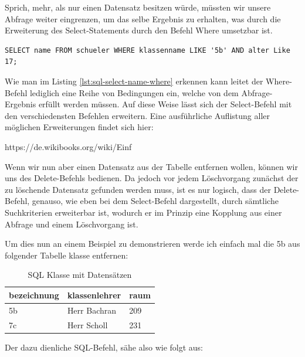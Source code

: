 \documentclass[12pt,a4paper,bibliography=totocnumbered,listof=totocnumbered]{scrartcl}
\begin{document}
Sprich, mehr, als nur einen Datensatz besitzen würde, müssten wir unsere Abfrage weiter eingrenzen, um das selbe Ergebnis zu erhalten, was durch die Erweiterung des \glqq Select-Statements\grqq{} durch den Befehl \glqq Where\grqq{} umsetzbar ist.


\vspace{1em}
\begin{lstlisting}[caption= SQL Select Name + Where, label=lst:sql-select-name-where]
SELECT name FROM schueler WHERE klassenname LIKE '5b' AND alter Like 17;
\end{lstlisting}

Wie man im Listing \ref{lst:sql-select-name-where} erkennen kann leitet der \glqq Where-Befehl\grqq{} lediglich eine Reihe von Bedingungen ein, welche von dem Abfrage-Ergebnis erfüllt werden müssen.
Auf diese Weise lässt sich der \glqq Select-Befehl\grqq{} mit den verschiedensten Befehlen erweitern.
Eine ausführliche Auflistung aller möglichen Erweiterungen findet sich hier:

https://de.wikibooks.org/wiki/Einf%

Wenn wir nun aber einen Datensatz aus der Tabelle entfernen wollen, können wir uns des  \glqq Delete-Befehls\grqq{} bedienen.
Da jedoch vor jedem Löschvorgang zunächst der zu löschende Datensatz gefunden werden muss, ist es nur logisch, dass der  \glqq Delete-Befehl\grqq{}, genauso, wie eben bei dem  \glqq Select-Befehl\grqq{} dargestellt, durch sämtliche Suchkriterien erweiterbar ist, wodurch er im Prinzip eine Kopplung aus einer Abfrage und einem Löschvorgang ist.

Um dies nun an einem Beispiel zu demonstrieren werde ich einfach mal die \glqq 5b\grqq{} aus folgender Tabelle \glqq klasse\grqq{} entfernen:\\
\vspace{1em}
\begin{table}[!h]
	\centering
	\begin{tabular}{|l|l|l|}
		\hline
		\textbf{bezeichnung} & \textbf{klassenlehrer} & \textbf{raum}\\
		\hline
		5b & Herr Bachran & 209\\
		\hline
		7c & Herr Scholl & 231\\
		
	\end{tabular}
	\caption{SQL Klasse mit Datensätzen}
	\label{tab:sql-klasse2}
\end{table}

Der dazu dienliche SQL-Befehl, sähe also wie folgt aus:
\end{document}
